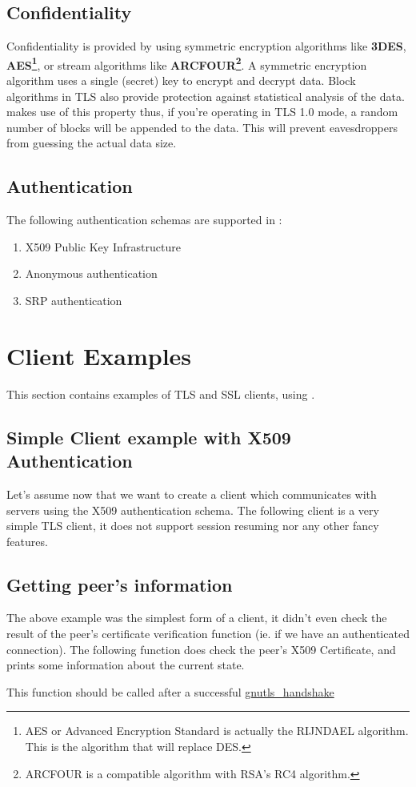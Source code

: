 \documentclass{book}
\begin{document}
\subsection{Confidentiality}
\par
Confidentiality is provided by using symmetric encryption algorithms like {\bf 3DES}, 
{\bf AES\footnote{AES or Advanced Encryption Standard is actually the RIJNDAEL algorithm. This is the
algorithm that will replace DES.}}, or
stream algorithms like {\bf ARCFOUR\footnote{ARCFOUR is a compatible
algorithm with RSA's RC4 algorithm.}}. A symmetric encryption algorithm uses a single (secret) key
to encrypt and decrypt data. Block algorithms in TLS also provide protection
against statistical analysis of the data. \gnutls makes use of this property
thus, if you're operating in TLS 1.0 mode, a random number of blocks will be
appended to the data. This will prevent eavesdroppers from guessing the 
actual data size.

\subsection{Authentication}
\par
The following authentication schemas are supported in \gnutls:
\begin{enumerate}
 \item X509 Public Key Infrastructure
 \item Anonymous authentication
 \item SRP authentication
\end{enumerate}



\section{Client Examples}
This section contains examples of TLS and SSL clients, using \gnutls. 

\subsection{Simple Client example with X509 Authentication}
Let's assume now that we want to create a client which communicates
with servers using the X509 authentication schema. The following client
is a very simple TLS client, it does not support session resuming nor
any other fancy features.


\subsection{Getting peer's information}
\par The above example was the simplest form of a client, it didn't even check
the result of the peer's certificate verification function (ie. if we have
an authenticated connection). The following function does check the peer's X509
Certificate, and prints some information about the current state.
\par
This function should be called after a successful
\hyperref{gnutls\_handshake()}{gnutls\_handshake() (see Section }{ for more information)}{gnutls_handshake}
\end{document}
